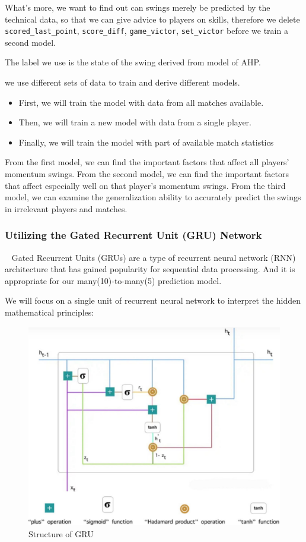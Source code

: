 What's more, we want to find out can swings merely be predicted by the technical data,
so that we can give advice to players on skills,
therefore we delete \verb|scored_last_point|, \verb|score_diff|, \verb|game_victor|, \verb|set_victor| before we train a second model.

The label we use is the state of the swing derived from model of AHP.

we use different sets of data to train and derive different models.

\begin{itemize}
    \item First, we will train the model with data from all matches available.
    \item Then, we will train a new model with data from a single player.
    \item Finally, we will train the model with part of available match statistics
\end{itemize}

From the first model, we can find the important factors that affect all players' momentum swings.
From the second model, we can find the important factors that affect 
especially well on that player's momentum swings.
From the third model, we can examine
the generalization ability to accurately predict the swings in irrelevant players and matches.

\subsubsection{Utilizing the Gated Recurrent Unit (GRU) Network}~{}
Gated Recurrent Units (GRUs)\cite{GRU} are a type of recurrent neural network (RNN) 
architecture that has gained popularity for sequential data processing. 
And it is appropriate for our many(10)-to-many(5) prediction model.

We will focus on a single unit of recurrent neural network to interpret the hidden mathematical principles:
\begin{figure}[H]
    \centering
    \includegraphics[scale=0.15]{mainmatter/imgs/6.jpg}
    \caption{Structure of GRU}
\end{figure}

